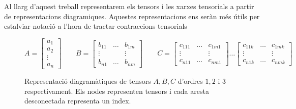 \documentclass[11pt,a4paper,openright,oneside]{article}
\numberwithin{equation}{section}
\theoremstyle{definition}
\begin{document}
Al llarg d'aquest treball representarem els tensors i les xarxes tensorials a partir de representacions diagramiques. Aquestes
representacions ens seràn més útils per estalviar notació a l'hora de tractar contraccions tensorials

\begin{figure}[h]
\begin{center}
    $$A = \begin{bmatrix}
        a_1 \\
        a_2 \\
        \vdots \\
        a_n
    \end{bmatrix} \qquad
    B = \begin{bmatrix}
        b_{11} & \dots & b_{1m} \\
        \vdots & & \vdots \\
        b_{n1} & \dots & b_{nm}
    \end{bmatrix}
    \qquad
    C=\begin{bmatrix}
        c_{111} & \dots & c_{1m1} \\
        \vdots & & \vdots \\
        c_{n11} & \dots & c_{nm1} 
    \end{bmatrix}
    \dots
\begin{bmatrix}
        c_{11k} & \dots & c_{1mk}\\
        \vdots & & \vdots \\
        c_{n1k} & \dots & c_{nmk} 
    \end{bmatrix}
    \
    $$

\qquad {}\qquad {}
\caption{
    Representació diagramàtiques de tensors $A,B,C$ d'ordres $1,2$ i $3$ respectivament. Els nodes representen tensors i cada aresta desconectada
    representa un index.
}
\end{center}
\label{fig:tnot}
\end{figure}
\end{document}
